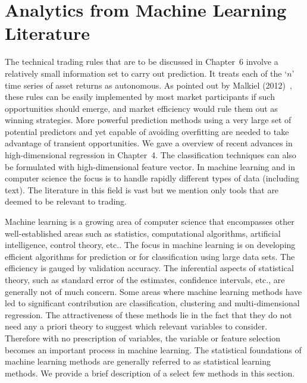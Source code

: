 \section{Analytics from Machine Learning Literature}


The technical trading rules that are to be discussed in Chapter~6 involve a relatively small information set to carry out prediction. It treats each of the `$n$' time series of asset returns as autonomous. As pointed out by Malkiel (2012)~\cite{malkiel}, these rules can be easily implemented by most market participants if such opportunities should emerge, and market efficiency would rule them out as winning strategies. More powerful prediction methods using a very large set of potential predictors and yet capable of avoiding overfitting are needed to take advantage of transient opportunities. We gave a overview of recent advances in high-dimensional regression in Chapter~4. The classification techniques can also be formulated with high-dimensional feature vector. In machine learning and in computer science the focus is to handle rapidly different types of data (including text). The literature in this field is vast but we mention only tools that are deemed to be relevant to trading. 


Machine learning is a growing area of computer science that encompasses other well-established areas such as statistics, computational algorithms, artificial intelligence, control theory, etc.. The focus in machine learning is on developing efficient algorithms for prediction or for classification using large data sets. The efficiency is gauged by validation accuracy. The inferential aspects of statistical theory, such as standard error of the estimates, confidence intervals, etc., are generally not of much concern. Some areas where machine learning methods have led to significant contribution are classification, clustering and multi-dimensional regression. The attractiveness of these methods lie in the fact that they do not need any a priori theory to suggest which relevant variables to consider. Therefore with no prescription of variables, the variable or feature selection becomes an important process in machine learning. The statistical foundations of machine learning methods are generally referred to as statistical learning methods. We provide a brief description of a select few methods in this section. \\


